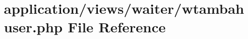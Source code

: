 \hypertarget{wtambahuser_8php}{}\section{application/views/waiter/wtambahuser.php File Reference}
\label{wtambahuser_8php}

